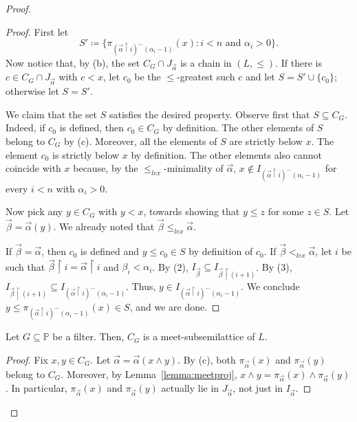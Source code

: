 \documentclass[10pt,a4paper]{amsart}
\begin{document}
\begin{proof}
\begin{proof}
First let 
\[
S' \coloneqq \big\{\pi_{(\vec{\alpha} \upharpoonright i)^\smallfrown (\alpha_i - 1)}(x) : i < n \text{ and } \alpha_i > 0\big\}.
\]
Now notice that, by (b), the set $C_G \cap J_{\vec{\alpha}}$ is a chain in $(L, \le)$. If there is $c \in C_G \cap J_{\vec{\alpha}}$ with $c < x$, let $c_0$ be the $\le$-greatest such $c$ and let $S = S' \cup \{c_0\}$; otherwise let $S = S'$.

We claim that the set $S$ satisfies the desired property. Observe first that $S \subseteq C_G$. Indeed, if $c_0$ is defined, then $c_0 \in C_G$ by definition. The other elements of $S$ belong to $C_G$ by (c). Moreover, all the elements of $S$ are strictly below $x$. The element $c_0$ is strictly below $x$ by definition. The other elements also cannot coincide with $x$ because, by the $\le_{lex}$-minimality of $\vec{\alpha}$, $x \not\in I_{(\vec{\alpha} \upharpoonright i)^\smallfrown (\alpha_i - 1)}$ for every  $i < n$ with $\alpha_i > 0$.

Now pick any $y \in C_G$ with $y < x$, towards showing that $y \le z$ for some $z \in S$. Let $\vec{\beta} = \vec{\alpha}(y)$. We already noted that $\vec{\beta} \le_{lex} \vec{\alpha}$. 

If $\vec{\beta} = \vec{\alpha}$, then $c_0$ is defined and $y \le c_0 \in S$ by definition of $c_0$. If $\vec{\beta} <_{lex} \vec{\alpha}$, let $i$ be such that $\vec{\beta} \upharpoonright i = \vec{\alpha} \upharpoonright i$ and $\beta_i < \alpha_i$. By (2), $I_{\vec{\beta}} \subseteq I_{\vec{\beta} \upharpoonright (i+1)}$. By (3), $I_{\vec{\beta} \upharpoonright (i+1)} \subseteq I_{(\vec{\alpha} \upharpoonright i)^\smallfrown (\alpha_i-1)}$. Thus, $y \in I_{(\vec{\alpha} \upharpoonright i)^\smallfrown (\alpha_i-1)}$. We conclude $y \le \pi_{(\vec{\alpha} \upharpoonright i)^\smallfrown (\alpha_i-1)}(x) \in S$, and we are done.
\end{proof}

\begin{claim}
Let $G\subseteq \mathbb{P}$ be a filter. Then, $C_G$ is a meet-subsemilattice of $L$.
\end{claim}
\begin{proof}
Fix $x,y \in C_G$. Let $\vec{\alpha} = \vec{\alpha}(x \wedge y)$.  By (c), both $\pi_{\vec{\alpha}} (x)$ and $\pi_{\vec{\alpha}} (y)$ belong to $C_G$. Moreover, by Lemma~\ref{lemma:meetproj}, $x \wedge y = \pi_{\vec{\alpha}} (x) \wedge \pi_{\vec{\alpha}} (y)$. In particular, $ \pi_{\vec{\alpha}}(x)$ and $ \pi_{\vec{\alpha}}(y)$ actually lie in $J_{\vec{\alpha}}$, not just in $I_{\vec{\alpha}}$.


\end{proof}
\end{proof}
\end{document}
